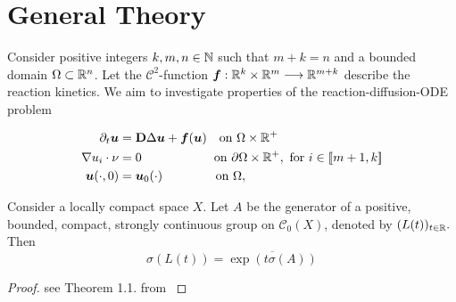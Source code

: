 \section{General Theory}

Consider positive integers $k, m, n \in \mathbb{N}$ such that $m+k = n$ and a bounded domain $\Omega \subset \mathbb{R}^{n}$. Let the $\mathcal C^2$-function $\bm f : \mathbb{R}^k \times \mathbb{R}^m \longrightarrow \mathbb{R}^{m+k}$ describe the reaction kinetics. We aim to investigate properties of the reaction-diffusion-ODE problem
 
\begin{align}
	\partial_t\bm{u}  &= \bm{\mathrm D} \Delta \bm{u} + \bm{f}(\bm{u}) \quad \text{on } \Omega \times \mathbb R^{+} \notag \\  \nabla u_i \cdot \nu &= 0 \qquad\qquad\qquad\! \text{on } \partial\Omega \times \mathbb R^{+}, \text{ for } i \in [\![ m+1, k ]\!]\\
	\bm{u}(\cdot, 0) &= \bm{u}_0(\cdot) \qquad\qquad\; \text{on } \Omega, \notag
\end{align}



\begin{theorem} 
	Consider a locally compact space $X$. Let $A$ be the generator of a positive, bounded, compact, strongly continuous group on $\mathcal C_0(X)$, denoted by $(L(t))_{t\in\mathbb{R}}.$ Then
	$$\sigma(L(t)) = \overline{\exp(t \sigma(A))}$$
\end{theorem}

\begin{proof}
	see Theorem 1.1. from \cite{Arendt1984}
\end{proof}


%
%


